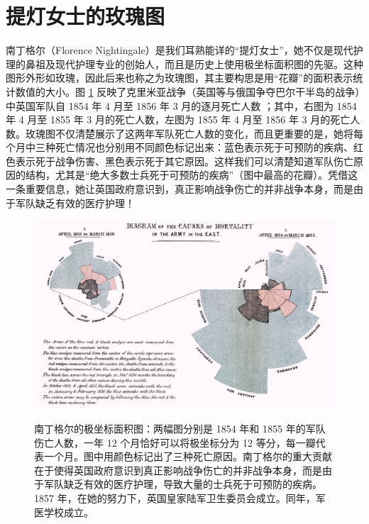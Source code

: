 \documentclass[
  b5paper,
  UTF8,twoside]{book}
\begin{document}
\section{提灯女士的玫瑰图}\label{sec:nightingale}

南丁格尔（Florence Nightingale）是我们耳熟能详的``提灯女士''，她不仅是现代护理的鼻祖及现代护理专业的创始人，而且是历史上使用极坐标面积图的先驱。这种图形外形如玫瑰，因此后来也称之为玫瑰图，其主要构思是用``花瓣''的面积表示统计数值的大小。图 \ref{fig:nightingale-mortality} 反映了克里米亚战争（英国等与俄国争夺巴尔干半岛的战争）中英国军队自 1854 年 4 月至 1856 年 3 月的逐月死亡人数 \citep{Nightingale58}；其中，右图为 1854 年 4 月至 1855 年 3 月的死亡人数，左图为 1855 年 4 月至 1856 年 3 月的死亡人数。玫瑰图不仅清楚展示了这两年军队死亡人数的变化，而且更重要的是，她将每个月中三种死亡情况也分别用不同颜色标记出来：蓝色表示死于可预防的疾病、红色表示死于战争伤害、黑色表示死于其它原因。这样我们可以清楚知道军队伤亡原因的结构，尤其是``绝大多数士兵死于可预防的疾病''（图中最高的花瓣）。凭借这一条重要信息，她让英国政府意识到，真正影响战争伤亡的并非战争本身，而是由于军队缺乏有效的医疗护理！

\begin{figure}

{\centering \href{<https://en.wikipedia.org/wiki/Florence_Nightingale>}{\includegraphics{images/Nightingale-mortality} }

}

\caption[Florence Nightingale 的极坐标面积图]{南丁格尔的极坐标面积图：两幅图分别是 1854 年和 1855 年的军队伤亡人数，一年 12 个月恰好可以将极坐标分为 12 等分，每一瓣代表一个月。图中用颜色标记出了三种死亡原因。南丁格尔的重大贡献在于使得英国政府意识到真正影响战争伤亡的并非战争本身，而是由于军队缺乏有效的医疗护理，导致大量的士兵死于可预防的疾病。1857 年，在她的努力下，英国皇家陆军卫生委员会成立。同年，军医学校成立。}\label{fig:nightingale-mortality}
\end{figure}
\end{document}

